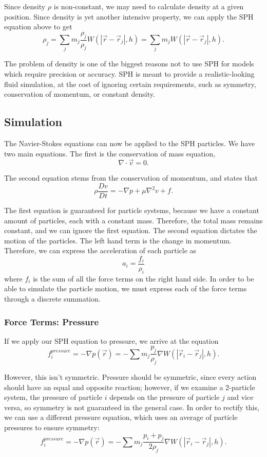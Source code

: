 \documentclass[a4paper]{article}
\begin{document}
Since density $\rho$ is non-constant, we may need to calculate density at a given position. Since density is yet another intensive property, we can apply the SPH equation above to get
\[\rho_j = \sum_j m_j \frac{\rho_j}{\rho_j} W(|\vec r - \vec r_j|, h) = \sum_j m_j W(|\vec r - \vec r_j|, h).\]

The problem of density is one of the biggest reasons not to use SPH for models which require precision or accuracy. SPH is meant to provide a realistic-looking fluid simulation, at the cost of ignoring certain requirements, such as symmetry, conservation of momentum, or constant density.

\subsection*{Simulation}
The Navier-Stokes equations can now be applied to the SPH particles. We have two main equations. The first is the conservation of mass equation, 
\[\nabla\cdot\vec v = 0.\]


The second equation stems from the conservation of momentum, and states that 
\[\rho\frac{Dv}{Dt} = -\nabla p + \mu \nabla^2 v + f.\]

The first equation is guaranteed for particle systems, because we have a constant amount of particles, each with a constant mass. Therefore, the total mass remains constant, and we can ignore the first equation. The second equation dictates the motion of the particles. The left hand term is the change in momentum. Therefore, we can express the acceleration of each particle as
\[a_i = \frac{f_i}{\rho_i}\]
where $f_i$ is the sum of all the force terms on the right hand side. In order to be able to simulate the particle motion, we must express each of the force terms through a discrete summation.

\subsubsection*{Force Terms: Pressure}
If we apply our SPH equation to pressure, we arrive at the equation
\[f^{pressure}_i = -\nabla p(\vec r) = -\sum m_j \frac{p_j}{\rho_j}\nabla W(|\vec r_i - \vec r_j|, h).\]


However, this isn't symmetric. Pressure should be symmetric, since every action should have an equal and opposite reaction; however, if we examine a 2-particle system, the pressure of particle $i$ depends on the pressure of particle $j$ and vice versa, so symmetry is not guaranteed in the general case. In order to rectify this, we can use a different pressure equation, which uses an average of particle pressures to ensure symmetry:
\[f^{pressure}_i = -\nabla p(\vec r) = -\sum m_j \frac{p_i + p_j}{2\rho_j}\nabla W(|\vec r_i - \vec r_j|, h).\]
\end{document}
